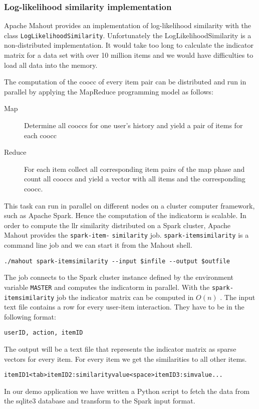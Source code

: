 \subsubsection{Log-likelihood similarity implementation}
\label{sec:llrimpl}

Apache Mahout provides an implementation of log-likelihood similarity with the class \verb|LogLikelihoodSimilarity|. Unfortunately the LogLikelihoodSimilarity is a non-distributed implementation. It would take too long to calculate the indicator matrix for a data set with over 10 million items and we would have difficulties to load all data into the memory. 

The computation of the \gls{coocc} of every item pair can be distributed and run in parallel by applying the MapReduce programming model as follows:
\begin{description}
\item[Map] Determine all \glspl{coocc} for one user's history and yield a pair of items for each \gls{coocc}
\item[Reduce] For each item collect all corresponding item pairs of the map phase and count all \glspl{coocc} and yield a vector with all items and the corresponding \gls{coocc}.
\end{description}

This task can run in parallel on different nodes on a cluster computer framework, such as Apache Spark. Hence the computation of the \gls{indicatorm} is \gls{scalable}.
In order to compute the \gls{llr} similarity distributed on a Spark cluster, Apache Mahout provides the \verb|spark-item-| \verb|similarity| job. 
\verb|spark-itemsimilarity| is a command line job and we can start it from the Mahout shell.
\begin{verbatim}
./mahout spark-itemsimilarity --input $infile --output $outfile
\end{verbatim}
The job connects to the Spark cluster instance defined by the environment variable \verb|MASTER| and computes the \gls{indicatorm} in parallel. With the \verb|spark-itemsimilarity| job the indicator matrix can be computed in $O(n)$ \cite{Schelter}. 
The input text file contains a row for every user-item interaction. They have to be in the following format:
\begin{verbatim}
userID, action, itemID
\end{verbatim}
The output will be a text file that represents the indicator matrix as sparse vectors for every item. For every item we get the similarities to all other items.
\begin{verbatim}
itemID1<tab>itemID2:similarityvalue<space>itemID3:simvalue...
\end{verbatim}

In our demo application we have written a Python script to fetch the data from the sqlite3 database and transform to the Spark input format.

